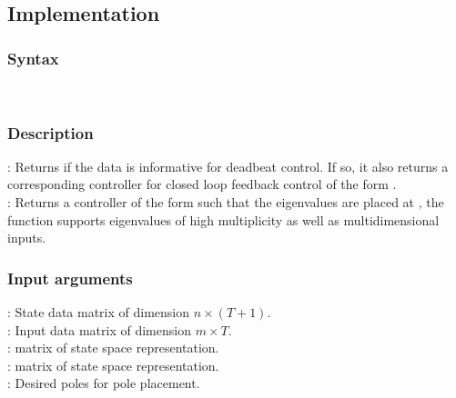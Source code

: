 
\subsection{Implementation}
\subsubsection*{Syntax}
 \\

\subsubsection*{Description}
: Returns if the data is informative for deadbeat control. If so, it also returns a corresponding controller  for closed loop feedback control of the form .\\
: Returns a controller  of the form  such that the eigenvalues are placed at , the function supports eigenvalues of high multiplicity as well as multidimensional inputs. 

\subsubsection*{Input arguments}
\textbf{}: State data matrix of dimension $n \times (T+1)$.\\
\textbf{}: Input data matrix of dimension $m \times T$.\\
\textbf{}:  matrix of state space representation.\\
\textbf{}:  matrix of state space representation.\\
\textbf{}: Desired poles for pole placement.

